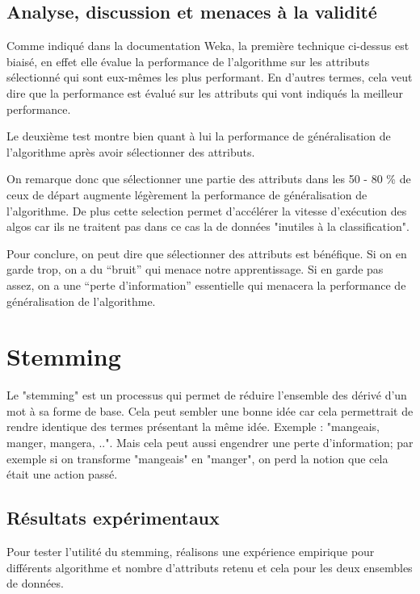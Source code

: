 \documentclass[a4paper,10pt]{article}
\begin{document}
\subsection{Analyse, discussion et menaces à la validité}

Comme indiqué dans la documentation Weka, la première technique ci-dessus est biaisé, en effet elle évalue la performance de l'algorithme sur les attributs sélectionné qui sont eux-mêmes les plus performant. En d'autres termes, cela veut dire que la performance est évalué sur les attributs qui vont indiqués la meilleur performance.

Le deuxième test montre bien quant à lui la performance de généralisation de l'algorithme après avoir sélectionner des attributs.

On remarque donc que sélectionner une partie des attributs dans les 50 - 80 \% de ceux de départ augmente légèrement la performance de généralisation de l'algorithme. De plus cette selection permet d'accélérer la vitesse d'exécution des algos car ils ne traitent pas dans ce cas la de données "inutiles à la classification".

Pour conclure, on peut dire que sélectionner des attributs est bénéfique. Si on en garde trop, on a du “bruit” qui menace notre apprentissage. Si en garde pas assez, on a une “perte d’information” essentielle qui menacera la performance de généralisation de l'algorithme.

\section{Stemming}

Le "stemming" est un processus qui permet de réduire l'ensemble des dérivé d'un mot à sa forme de base. Cela peut sembler une bonne idée car cela permettrait de rendre identique des termes présentant la même idée. Exemple : "mangeais, manger, mangera, ..". Mais cela peut aussi engendrer une perte d'information; par exemple si on transforme "mangeais" en "manger", on perd la notion que cela était une action passé.

\subsection{Résultats expérimentaux}

Pour tester l'utilité du stemming, réalisons une expérience empirique pour différents algorithme et nombre d'attributs retenu et cela pour les deux ensembles de données.
\end{document}
